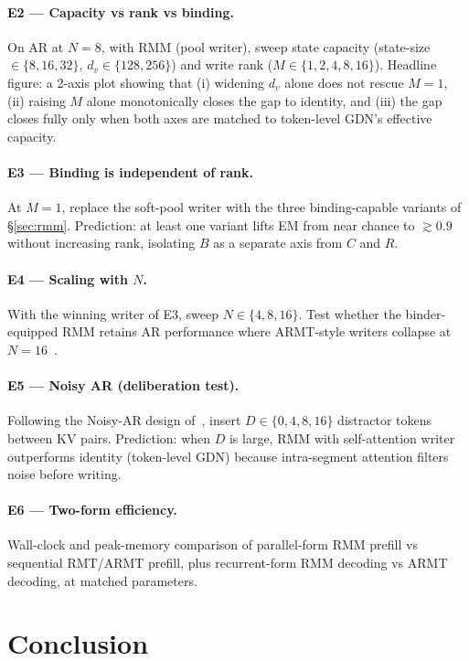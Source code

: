 \documentclass[11pt]{article}
\begin{document}
\paragraph{E2 — Capacity vs rank vs binding.}
On AR at $N{=}8$, with RMM (pool writer), sweep state capacity (state-size $\in \{8, 16, 32\}$, $d_v \in \{128, 256\}$) and write rank ($M \in \{1, 2, 4, 8, 16\}$). Headline figure: a 2-axis plot showing that (i) widening $d_v$ alone does not rescue $M{=}1$, (ii) raising $M$ alone monotonically closes the gap to identity, and (iii) the gap closes fully only when both axes are matched to token-level GDN's effective capacity.

\paragraph{E3 — Binding is independent of rank.}
At $M{=}1$, replace the soft-pool writer with the three binding-capable variants of \S\ref{sec:rmm}. Prediction: at least one variant lifts EM from near chance to $\gtrsim 0.9$ without increasing rank, isolating $B$ as a separate axis from $C$ and $R$.

\paragraph{E4 — Scaling with $N$.}
With the winning writer of E3, sweep $N \in \{4, 8, 16\}$. Test whether the binder-equipped RMM retains AR performance where ARMT-style writers collapse at $N{=}16$~\citep{kuzmin2026extending}.

\paragraph{E5 — Noisy AR (deliberation test).}
Following the Noisy-AR design of~\citet{arora2024just}, insert $D \in \{0, 4, 8, 16\}$ distractor tokens between KV pairs. Prediction: when $D$ is large, RMM with self-attention writer outperforms identity (token-level GDN) because intra-segment attention filters noise before writing.

\paragraph{E6 — Two-form efficiency.}
Wall-clock and peak-memory comparison of parallel-form RMM prefill vs sequential RMT/ARMT prefill, plus recurrent-form RMM decoding vs ARMT decoding, at matched parameters.


\section{Conclusion}
\end{document}
